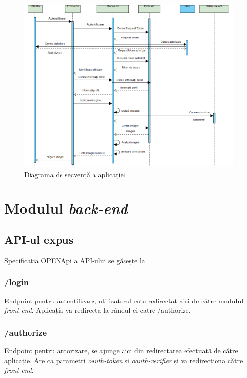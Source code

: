 \begin{figure}[!htbp]
    \begin{center}
        \includegraphics[width=1.0\textwidth]{images/secventa.png}
        \caption{Diagrama de secvență a aplicației}
    \end{center}
\end{figure}

\section{Modulul \textit{back-end}}

\subsection{API-ul expus}
Specificația OPENApi a API-ului se găsește la ~
\subsubsection{/login}
Endpoint pentru autentificare, utilizatorul este redirectat aici de către modulul \textit{front-end}. Aplicația va redirecta la rândul ei catre /authorize.

\subsubsection{/authorize}
Endpoint pentru autorizare, se ajunge aici din redirectarea efectuată de către aplicație. Are ca parametri \textit{oauth-token} și \textit{oauth-verifier} și va redirecționa către \textit{front-end}.

